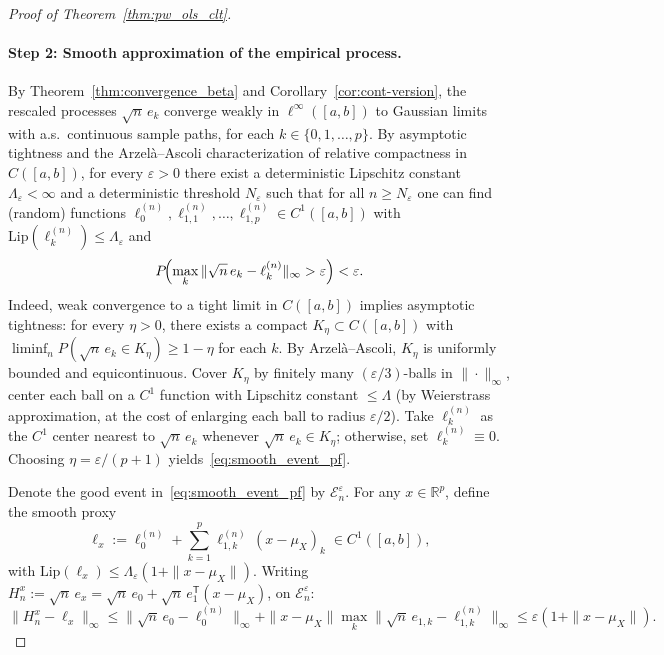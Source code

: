 \documentclass[12pt]{article}
\newcommand{\T}{\mathsf{T}} %
\newcommand{\R}{\mathbb{R}} %
\begin{document}
\begin{proof}[Proof of Theorem~\ref{thm:pw_ols_clt}]
\paragraph{Step 2: Smooth approximation of the empirical process.}
By Theorem~\ref{thm:convergence_beta} and Corollary~\ref{cor:cont-version}, the rescaled processes $\sqrt{n}\,e_k$ converge weakly in $\ell^\infty([a,b])$ to Gaussian limits with a.s.\ continuous sample paths, for each $k\in\{0,1,\dots,p\}$. By asymptotic tightness and the Arzel\`a--Ascoli characterization of relative compactness in $C([a,b])$, for every $\varepsilon>0$ there exist a deterministic Lipschitz constant $\Lambda_\varepsilon<\infty$ and a deterministic threshold $N_\varepsilon$ such that for all $n\ge N_\varepsilon$ one can find (random) functions $\ell_0^{(n)},\ell_{1,1}^{(n)},\dots,\ell_{1,p}^{(n)}\in C^1([a,b])$ with $\mathrm{Lip}(\ell_k^{(n)})\le\Lambda_\varepsilon$ and
\begin{equation}\label{eq:smooth_event_pf}
P\!\Bigl(\max_{k}\|\sqrt{n}\,e_k-\ell_k^{(n)}\|_\infty>\varepsilon\Bigr)<\varepsilon.
\end{equation}
Indeed, weak convergence to a tight limit in $C([a,b])$ implies asymptotic tightness: for every $\eta>0$, there exists a compact $K_\eta\subset C([a,b])$ with $\liminf_n P(\sqrt{n}\,e_k\in K_\eta)\ge 1-\eta$ for each $k$. By Arzel\`a--Ascoli, $K_\eta$ is uniformly bounded and equicontinuous. Cover $K_\eta$ by finitely many $(\varepsilon/3)$-balls in $\|\cdot\|_\infty$, center each ball on a $C^1$ function with Lipschitz constant $\le\Lambda$ (by Weierstrass approximation, at the cost of enlarging each ball to radius $\varepsilon/2$). Take $\ell_k^{(n)}$ as the $C^1$ center nearest to $\sqrt{n}\,e_k$ whenever $\sqrt{n}\,e_k\in K_\eta$; otherwise, set $\ell_k^{(n)}\equiv 0$. Choosing $\eta=\varepsilon/(p+1)$ yields~\eqref{eq:smooth_event_pf}.
 
Denote the good event in~\eqref{eq:smooth_event_pf} by $\mathcal{E}_n^\varepsilon$. For any $x\in\R^p$, define the smooth proxy
\[
\ell_x:=\ell_0^{(n)}+\sum_{k=1}^p\ell_{1,k}^{(n)}\,(x-\mu_X)_k\;\in C^1([a,b]),
\]
with $\mathrm{Lip}(\ell_x)\le\Lambda_\varepsilon(1+\|x-\mu_X\|)$. Writing $H_n^x:=\sqrt{n}\,e_x=\sqrt{n}\,e_0+\sqrt{n}\,e_1^{\!\T}(x-\mu_X)$, on $\mathcal{E}_n^\varepsilon$:
\begin{equation}\label{eq:Hx_ell_pf}
\|H_n^x-\ell_x\|_\infty
\le\|\sqrt{n}\,e_0-\ell_0^{(n)}\|_\infty+\|x-\mu_X\|\max_k\|\sqrt{n}\,e_{1,k}-\ell_{1,k}^{(n)}\|_\infty
\le\varepsilon(1+\|x-\mu_X\|).
\end{equation}
 

\end{proof}
\end{document}
